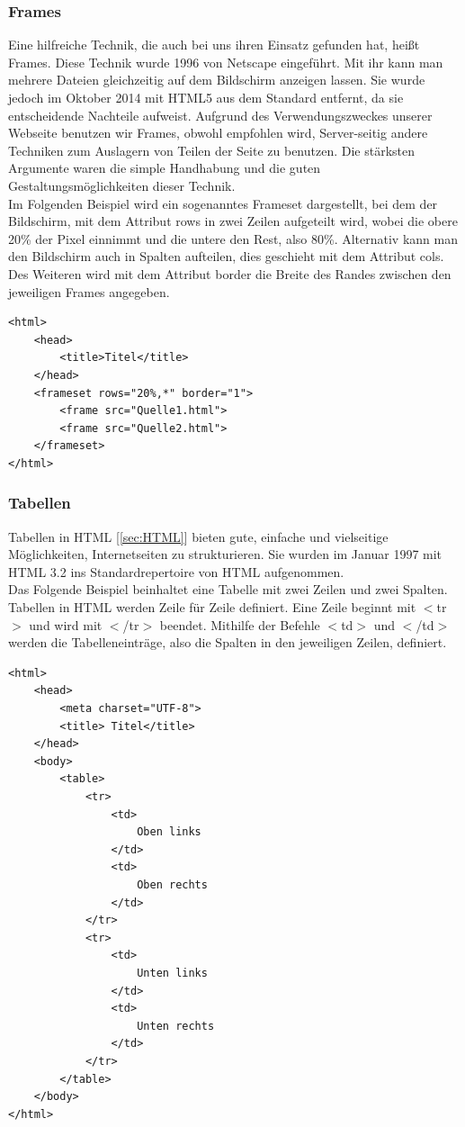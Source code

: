 \documentclass[12pt,a4paper,bibliography=totocnumbered,listof=totocnumbered]{scrartcl}
\begin{document}
\subsubsection{Frames}
\label{sec:Frames}
Eine hilfreiche Technik, die auch bei uns ihren Einsatz gefunden hat, heißt Frames. Diese Technik wurde 1996 von Netscape eingeführt. Mit ihr kann man mehrere Dateien gleichzeitig auf dem Bildschirm anzeigen lassen.\cite{HTML/Frames} Sie wurde jedoch im Oktober 2014 mit HTML5\cite{HTML5} aus dem Standard entfernt, da sie entscheidende Nachteile aufweist. Aufgrund des Verwendungszweckes unserer Webseite benutzen wir Frames, obwohl empfohlen wird, Server-seitig andere Techniken zum Auslagern von Teilen der Seite zu benutzen.\cite{HTML/Frames} Die stärksten Argumente waren die simple Handhabung und die guten Gestaltungsmöglichkeiten dieser Technik. \\
Im Folgenden Beispiel wird ein sogenanntes Frameset dargestellt, bei dem der Bildschirm, mit dem Attribut \glqq rows\grqq{} in zwei Zeilen aufgeteilt wird, wobei die obere 20\% der Pixel einnimmt und die untere den Rest, also 80\%. Alternativ kann man den Bildschirm auch in Spalten aufteilen, dies geschieht mit dem Attribut \glqq cols\grqq . Des Weiteren wird mit dem Attribut \glqq border\grqq{} die Breite des Randes zwischen den jeweiligen Frames angegeben.

\pagebreak
\begin{lstlisting}[caption= Beispiel für Frames in HTML, label=lst:HTML]
<html>
	<head>
		<title>Titel</title>
	</head>
	<frameset rows="20%,*" border="1">
		<frame src="Quelle1.html">
		<frame src="Quelle2.html">
	</frameset>
</html>
\end{lstlisting}

\subsubsection{Tabellen}
\label{sec:Tabellen}
Tabellen in HTML [\ref{sec:HTML}] bieten gute, einfache und vielseitige Möglichkeiten, Internetseiten zu strukturieren. Sie wurden im Januar 1997 mit HTML 3.2 ins Standardrepertoire von HTML aufgenommen.\cite{Hypertext_Markup_Language} \\
Das Folgende Beispiel beinhaltet eine Tabelle mit zwei Zeilen und zwei Spalten. Tabellen in HTML werden Zeile für Zeile definiert. Eine Zeile beginnt mit $<$tr$>$ und wird mit $<$/tr$>$ beendet. Mithilfe der Befehle $<$td$>$ und $<$/td$>$ werden die Tabelleneinträge, also die Spalten in den jeweiligen Zeilen, definiert.
\pagebreak
\vspace{1em}
\begin{lstlisting}[caption= Beispiel für Tabellen in HTML, label=lst:HTML]
<html>
	<head>
		<meta charset="UTF-8">		
		<title> Titel</title>
	</head>
	<body>
		<table>
			<tr>
				<td>
					Oben links
				</td>
				<td>
					Oben rechts
				</td>
			</tr>
			<tr>
				<td>
					Unten links
				</td>
				<td>
					Unten rechts
				</td>
			</tr>
		</table>
	</body>
</html>
\end{lstlisting}
\end{document}
